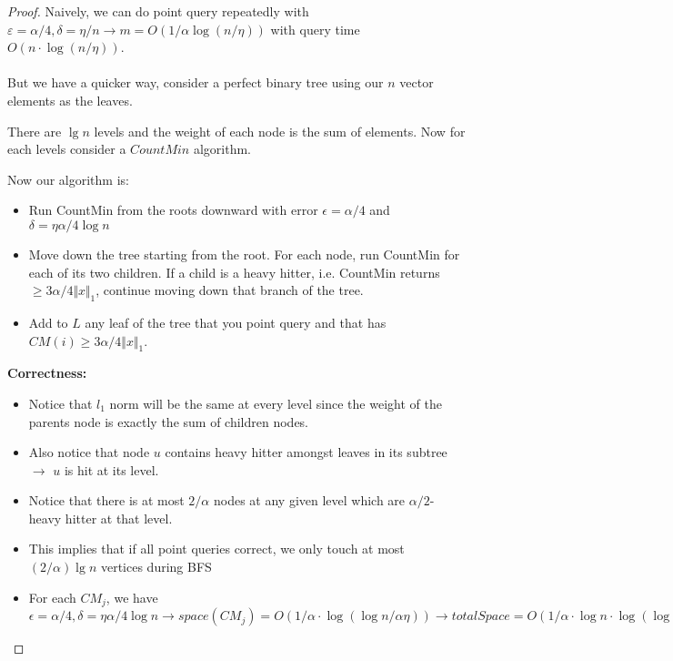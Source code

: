\documentclass[11pt]{article}
\begin{document}
\begin{proof}

Naively, we can do point query repeatedly with $\varepsilon= \alpha/4, \delta=\eta/n\rightarrow m = O(1/\alpha \log(n/\eta))$ with query time $O(n\cdot \log(n/\eta))$.\\\\
But we have a quicker way, consider a perfect binary tree using our $n$ vector elements as the leaves. 

\begin{center}
\end{center}

There are $\lg n$ levels and the weight of each node is the sum of elements. Now for each levels consider a $CountMin$ algorithm. 

Now our algorithm is:
\begin{itemize}
\item {\em} Run CountMin from the roots downward with error $\epsilon = \alpha/4$ and $\delta=\eta\alpha/4\log n$
\item {\em} Move down the tree starting from the root. For each node, run CountMin for each of its two children. If a child is a heavy hitter, i.e. CountMin returns $\geq 3\alpha/4 \Vert x\Vert_1$, continue moving down that branch of the tree.
\item {\em} Add to $L$ any leaf of the tree that you point query and that has $CM(i) \geq 3\alpha/4 \Vert x\Vert_1$.
\end{itemize}

{\bf Correctness:}
\begin{itemize}
\item Notice that $l_1$ norm will be the same at every level since the weight of the parents node is exactly the sum of children nodes.
\item Also notice that node $u$ contains heavy hitter amongst leaves in its subtree $\rightarrow$ $u$ is hit at its level.
\item Notice that there is at most $2/\alpha$ nodes at any given level which are $\alpha/2$-heavy hitter at that level. 
\item This implies that if all point queries correct, we only touch at most $(2/\alpha) \lg n$ vertices during BFS
\item For each $CM_j$, we have $\epsilon = \alpha/4, \delta=\eta\alpha/4\log n\rightarrow space(CM_j) = O(1/\alpha\cdot \log(\log n/\alpha\eta))\rightarrow totalSpace = O(1/\alpha\cdot \log n\cdot \log(\log n/\alpha\eta))$
\end{itemize}
\end{proof}
\end{document}
